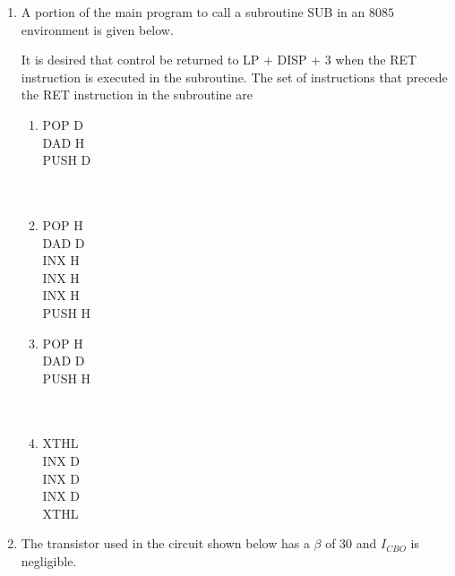 \documentclass[journal]{IEEEtran}
\begin{document}
\begin{enumerate}[start=27]
\item  A portion of the main program to call a subroutine SUB in an $8085$ environment is given below.
\begin{center}
    
\end{center}

It is desired that control be returned to LP + DISP + 3 when the RET instruction is executed in the subroutine. The set of instructions that precede the RET instruction in the subroutine are
\begin{multicols}{4}
\begin{enumerate}
\item POP \hfill{D} \\ DAD \hfill{H}\\ PUSH \hfill{D} \\\\\\
\item  POP \hfill{H}\\ DAD \hfill{D}\\ INX \hfill{H}\\ INX \hfill{H}\\ INX \hfill{H}\\ PUSH \hfill{H}
\item  POP \hfill{H}\\ DAD \hfill{D}\\ PUSH \hfill{H}\\\\\\
\item XTHL\\ INX \hfill{D}\\ INX \hfill{D}\\ INX \hfill{D}\\ XTHL
\end{enumerate}
\end{multicols}

\item The transistor used in the circuit shown below has a $\beta$ of $30$ and $I_{CBO}$ is negligible.
\begin{center}
    

\end{center}
\end{enumerate}
\end{document}
